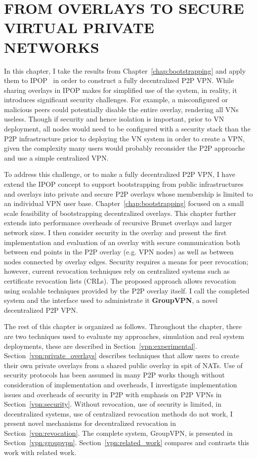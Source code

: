 \chapter{FROM OVERLAYS TO SECURE VIRTUAL PRIVATE NETWORKS}
\label{chap:security}

In this chapter, I take the results from Chapter~\ref{chap:bootstrapping} and
apply them to IPOP~\cite{ipop} in order to construct a fully decentralized P2P
VPN.  While sharing overlays in IPOP makes for simplified use of the system, in
reality, it introduces significant security challenges.  For example, a
misconfigured or malicious peers could potentially disable the entire overlay,
rendering all VNs useless.  Though if security and hence isolation is
important, prior to VN deployment, all nodes would need to be configured with a
security stack than the P2P infrastructure prior to deploying the VN system in
order to create a VPN, given the complexity many users would probably
reconsider the P2P approache and use a simple centralized VPN.

To address this challenge, or to make a fully decentralized P2P VPN, I have
extend the IPOP concept to support bootstrapping from public infrastructures
and overlays into private and secure P2P overlays whose membership is limited
to an individual VPN user base.  Chapter~\ref{chap:bootstrapping} focused on a
small scale feasibility of bootstrapping decentralized overlays.  This chapter
further extends into performance overheads of recursive Brunet overlays and
larger network sizes.  I then consider security in the overlay and present the
first implementation and evaluation of an overlay with secure communication
both between end points in the P2P overlay (e.g. VPN nodes) as well as between
nodes connected by overlay edges.  Security requires a means for peer
revocation; however, current revocation techniques rely on centralized systems
such as certificate revocation lists (CRLs). The proposed approach allows
revocation using scalable techniques provided by the P2P overlay itself.  I
call the completed system and the interface used to administrate it {\bf
GroupVPN}, a novel decentralized P2P VPN.

The rest of this chapter is organized as follows.  Throughout the chapter,
there are two techniques used to evaluate my approaches, simulation and real
system deployments, these are described in Section~\ref{vpn:experimental}.
Section~\ref{vpn:private_overlays} describes techniques that allow users to
create their own private overlays from a shared public overlay in spit of NATs.
Use of security protocols has been assumed in many P2P works though without
consideration of implementation and overheads, I investigate implementation
issues and overheads of security in P2P with emphasis on P2P VPNs in
Section~\ref{vpn:security}.  Without revocation, use of security is limited, in
decentralized systems, use of centralized revocation methods do not work, I
present novel mechanisms for decentralized revocation in
Section~\ref{vpn:revocation}.  The complete system, GroupVPN, is presented in
Section~\ref{vpn:groupvpn}.  Section~\ref{vpn:related_work} compares and
contrasts this work with related work.  

